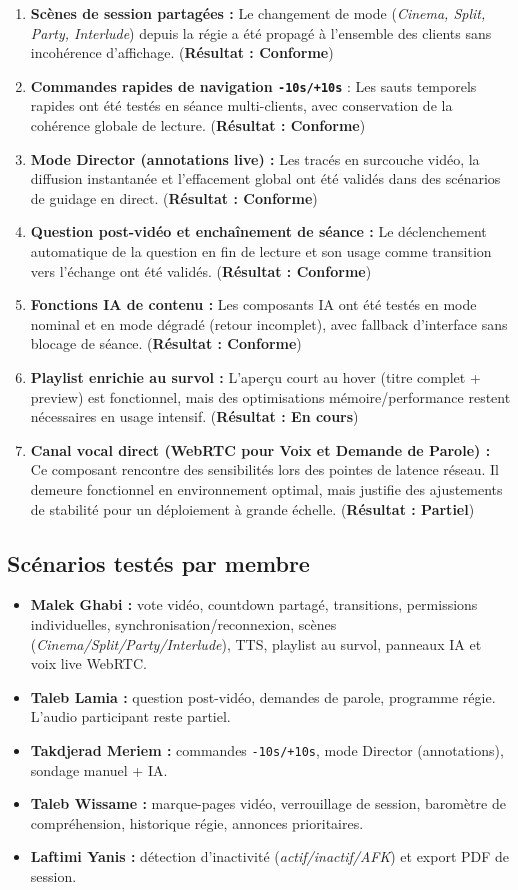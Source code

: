 \documentclass[11pt,a4paper]{report}
\begin{document}
\begin{enumerate}
    \item \textbf{Scènes de session partagées :} Le changement de mode (\textit{Cinema, Split, Party, Interlude}) depuis la régie a été propagé à l'ensemble des clients sans incohérence d'affichage. (\textbf{Résultat : Conforme})
    \item \textbf{Commandes rapides de navigation \texttt{-10s/+10s}} : Les sauts temporels rapides ont été testés en séance multi-clients, avec conservation de la cohérence globale de lecture. (\textbf{Résultat : Conforme})
    \item \textbf{Mode Director (annotations live) :} Les tracés en surcouche vidéo, la diffusion instantanée et l'effacement global ont été validés dans des scénarios de guidage en direct. (\textbf{Résultat : Conforme})
    \item \textbf{Question post-vidéo et enchaînement de séance :} Le déclenchement automatique de la question en fin de lecture et son usage comme transition vers l'échange ont été validés. (\textbf{Résultat : Conforme})
    \item \textbf{Fonctions IA de contenu :} Les composants IA ont été testés en mode nominal et en mode dégradé (retour incomplet), avec fallback d'interface sans blocage de séance. (\textbf{Résultat : Conforme})
    \item \textbf{Playlist enrichie au survol :} L'aperçu court au hover (titre complet + preview) est fonctionnel, mais des optimisations mémoire/performance restent nécessaires en usage intensif. (\textbf{Résultat : En cours})
    \item \textbf{Canal vocal direct (WebRTC pour Voix et Demande de Parole) :} Ce composant rencontre des sensibilités lors des pointes de latence réseau. Il demeure fonctionnel en environnement optimal, mais justifie des ajustements de stabilité pour un déploiement à grande échelle. (\textbf{Résultat : Partiel})
\end{enumerate}

\subsection*{Scénarios testés par membre}
\begin{itemize}
    \item \textbf{Malek Ghabi :} vote vidéo, countdown partagé, transitions, permissions individuelles, synchronisation/reconnexion, scènes (\textit{Cinema/Split/Party/Interlude}), TTS, playlist au survol, panneaux IA et voix live WebRTC.
    \item \textbf{Taleb Lamia :} question post-vidéo, demandes de parole, programme régie. L'audio participant reste partiel.
    \item \textbf{Takdjerad Meriem :} commandes \texttt{-10s/+10s}, mode Director (annotations), sondage manuel + IA.
    \item \textbf{Taleb Wissame :} marque-pages vidéo, verrouillage de session, baromètre de compréhension, historique régie, annonces prioritaires.
    \item \textbf{Laftimi Yanis :} détection d'inactivité (\textit{actif/inactif/AFK}) et export PDF de session.
\end{itemize}
\end{document}
